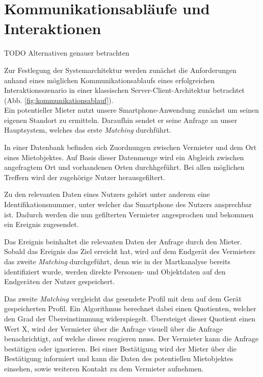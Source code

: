 
\section{Kommunikationsabläufe und Interaktionen}

TODO Alternativen genauer betrachten

Zur Festlegung der Systemarchitektur werden zunächst die Anforderungen anhand eines möglichen Kommunikationsablaufs eines erfolgreichen Interaktionsszenario in einer klassischen Server-Client-Architektur betrachtet (Abb. \ref{fig:kommunikationsablauf}).\\

Ein potentieller Mieter nutzt unsere Smartphone-Anwendung zunächst um seinen eigenen Standort zu ermitteln. Daraufhin sendet er seine Anfrage an unser Hauptsystem, welches das erste \textit{Matching} durchführt.

In einer Datenbank befinden sich Zuordnungen zwischen Vermieter und dem Ort eines Mietobjektes. Auf Basis dieser Datenmenge wird ein Abgleich zwischen angefragtem Ort und vorhandenen Orten durchhgeführt. Bei allen möglichen Treffern wird der zugehörige Nutzer herausgefiltert.

Zu den relevanten Daten eines Nutzers gehört unter anderem eine Identifikationsnummer, unter welcher das Smartphone des Nutzers ansprechbar ist.
Dadurch werden die nun gefilterten Vermieter angesprochen und bekommen ein Ereignis zugesendet.

Das Ereignis beinhaltet die relevanten Daten der Anfrage durch den Mieter. Sobald das Ereignis das Ziel erreicht hat, wird auf dem Endgerät des Vermieters das zweite \textit{Matching} durchgeführt, denn wie in der Martkanalyse bereits identifiziert wurde, werden direkte Personen- und Objektdaten auf den Endgeräten der Nutzer gespeichert.

Das zweite \textit{Matching} vergleicht das gesendete Profil mit dem auf dem Gerät gespeicherten Profil. Ein Algorithmus berechnet dabei einen Quotienten, welcher den Grad der Übereinstimmung widerspiegelt. Übersteiget dieser Quotient einen Wert X, wird der Vermieter über die Anfrage visuell über die Anfrage benachrichtigt, auf welche dieses reagieren muss.
Der Vermieter kann die Anfrage bestätigen oder ignorieren. Bei einer Bestätigung wird der Mieter über die Bestätigung informiert und kann die Daten des potentiellen Mietobjektes einsehen, sowie weiteren Kontakt zu dem Vermieter aufnehmen.

